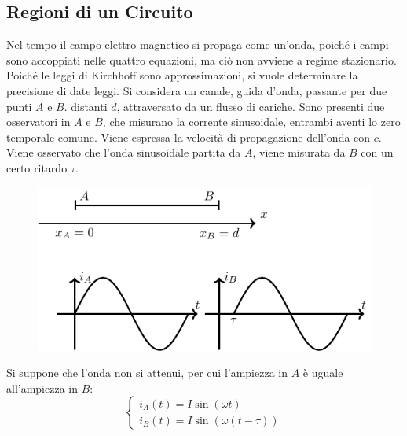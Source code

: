 \documentclass{article}
\numberwithin{equation}{subsection}
\begin{document}
\subsection{Regioni di un Circuito}

Nel tempo il campo elettro-magnetico si propaga come un'onda, poiché i campi sono accoppiati nelle quattro equazioni, ma ciò non avviene a regime stazionario. Poiché le leggi di 
Kirchhoff sono approssimazioni, si vuole determinare la precisione di date leggi. Si considera un canale, guida d'onda, passante per due punti $A$ e $B$. distanti $d$, 
attraversato da un flusso di cariche. Sono presenti due osservatori in $A$ e $B$, che misurano la corrente sinusoidale, entrambi aventi lo zero temporale comune. Viene 
espressa la velocità di propagazione dell'onda con $c$. Viene osservato che l'onda sinusoidale partita da $A$, viene misurata da $B$ con un certo ritardo $\tau$. 

\begin{figure}[H]%
    \centering
    \includegraphics{onda-distanza.pdf}
    \label{fig:onda-distanza}
\end{figure}


Si suppone che l'onda non si attenui, per cui l'ampiezza in $A$ è uguale all'ampiezza in $B$: 
\begin{equation*}
    \begin{cases}
        i_A(t)=I\sin(\omega t)\\
        i_B(t)=I\sin(\omega(t-\tau))
    \end{cases}
\end{equation*}
\end{document}
